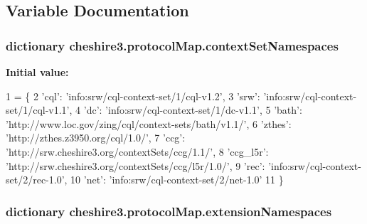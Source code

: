 \subsection{Variable Documentation}
\hypertarget{namespacecheshire3_1_1protocol_map_a2107187568043b3702cf6efbb15dbcc9}{
\subsubsection[{context\-Set\-Namespaces}]{\setlength{\rightskip}{0pt plus 5cm}dictionary cheshire3.\-protocol\-Map.\-context\-Set\-Namespaces}}\label{namespacecheshire3_1_1protocol_map_a2107187568043b3702cf6efbb15dbcc9}
{\bfseries Initial value\-:}
\begin{DoxyCode}
1 = \{
2   \textcolor{stringliteral}{'cql'}: \textcolor{stringliteral}{'info:srw/cql-context-set/1/cql-v1.2'},
3   \textcolor{stringliteral}{'srw'}: \textcolor{stringliteral}{'info:srw/cql-context-set/1/cql-v1.1'},
4   \textcolor{stringliteral}{'dc'}: \textcolor{stringliteral}{'info:srw/cql-context-set/1/dc-v1.1'},
5   \textcolor{stringliteral}{'bath'}: \textcolor{stringliteral}{'http://www.loc.gov/zing/cql/context-sets/bath/v1.1/'},
6   \textcolor{stringliteral}{'zthes'}: \textcolor{stringliteral}{'http://zthes.z3950.org/cql/1.0/'},
7   \textcolor{stringliteral}{'ccg'}: \textcolor{stringliteral}{'http://srw.cheshire3.org/contextSets/ccg/1.1/'},
8   \textcolor{stringliteral}{'ccg\_l5r'}: \textcolor{stringliteral}{'http://srw.cheshire3.org/contextSets/ccg/l5r/1.0/'},
9   \textcolor{stringliteral}{'rec'}: \textcolor{stringliteral}{'info:srw/cql-context-set/2/rec-1.0'},
10   \textcolor{stringliteral}{'net'}: \textcolor{stringliteral}{'info:srw/cql-context-set/2/net-1.0'}
11 \}
\end{DoxyCode}
\hypertarget{namespacecheshire3_1_1protocol_map_a8547471ef4b888734ea961e9e9955104}{
\subsubsection[{extension\-Namespaces}]{\setlength{\rightskip}{0pt plus 5cm}dictionary cheshire3.\-protocol\-Map.\-extension\-Namespaces}}\label{namespacecheshire3_1_1protocol_map_a8547471ef4b888734ea961e9e9955104}
